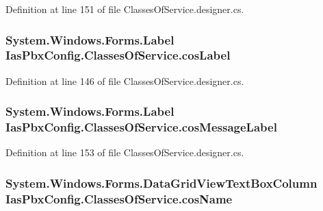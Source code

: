 Definition at line 151 of file ClassesOfService.designer.cs.\hypertarget{class_ias_pbx_config_1_1_classes_of_service_a55b81dc19715763881780e3a83d3128d}{
\subsubsection[{cosLabel}]{\setlength{\rightskip}{0pt plus 5cm}System.Windows.Forms.Label {\bf IasPbxConfig.ClassesOfService.cosLabel}}}
\label{class_ias_pbx_config_1_1_classes_of_service_a55b81dc19715763881780e3a83d3128d}


Definition at line 146 of file ClassesOfService.designer.cs.\hypertarget{class_ias_pbx_config_1_1_classes_of_service_a4b9654ea6da7c2e26c008eab8658f3cb}{
\subsubsection[{cosMessageLabel}]{\setlength{\rightskip}{0pt plus 5cm}System.Windows.Forms.Label {\bf IasPbxConfig.ClassesOfService.cosMessageLabel}}}
\label{class_ias_pbx_config_1_1_classes_of_service_a4b9654ea6da7c2e26c008eab8658f3cb}


Definition at line 153 of file ClassesOfService.designer.cs.\hypertarget{class_ias_pbx_config_1_1_classes_of_service_a98321cd95fe0cb558ab4cc16dbed0937}{
\subsubsection[{cosName}]{\setlength{\rightskip}{0pt plus 5cm}System.Windows.Forms.DataGridViewTextBoxColumn {\bf IasPbxConfig.ClassesOfService.cosName}}}
\label{class_ias_pbx_config_1_1_classes_of_service_a98321cd95fe0cb558ab4cc16dbed0937}


